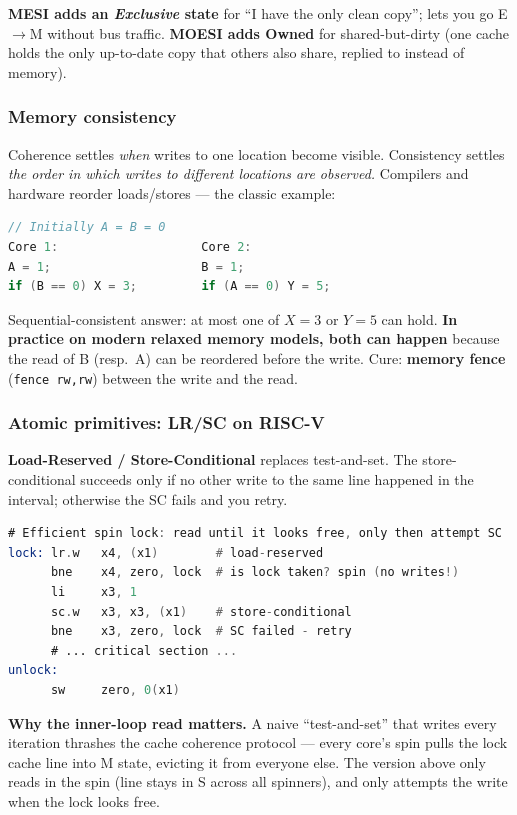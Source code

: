 \documentclass[11pt,a4paper]{article}
\begin{document}
\textbf{MESI adds an \emph{Exclusive} state} for ``I have the only clean copy''; lets you go E$\rightarrow$M without bus traffic. \textbf{MOESI adds Owned} for shared-but-dirty (one cache holds the only up-to-date copy that others also share, replied to instead of memory).

\subsubsection*{Memory consistency}

Coherence settles \emph{when} writes to one location become visible. Consistency settles \emph{the order in which writes to different locations are observed.} Compilers and hardware reorder loads/stores --- the classic example:

\begin{lstlisting}[language=c]
// Initially A = B = 0
Core 1:                    Core 2:
A = 1;                     B = 1;
if (B == 0) X = 3;         if (A == 0) Y = 5;
\end{lstlisting}

Sequential-consistent answer: at most one of $X=3$ or $Y=5$ can hold. \textbf{In practice on modern relaxed memory models, both can happen} because the read of B (resp.\ A) can be reordered before the write. Cure: \textbf{memory fence} (\verb|fence rw,rw|) between the write and the read.

\subsubsection*{Atomic primitives: LR/SC on RISC-V}

\textbf{Load-Reserved / Store-Conditional} replaces test-and-set. The store-conditional succeeds only if no other write to the same line happened in the interval; otherwise the SC fails and you retry.

\begin{lstlisting}[language=asm]
# Efficient spin lock: read until it looks free, only then attempt SC
lock: lr.w   x4, (x1)        # load-reserved
      bne    x4, zero, lock  # is lock taken? spin (no writes!)
      li     x3, 1
      sc.w   x3, x3, (x1)    # store-conditional
      bne    x3, zero, lock  # SC failed - retry
      # ... critical section ...
unlock:
      sw     zero, 0(x1)
\end{lstlisting}

\textbf{Why the inner-loop read matters.} A naive ``test-and-set'' that writes every iteration thrashes the cache coherence protocol --- every core's spin pulls the lock cache line into M state, evicting it from everyone else. The version above only reads in the spin (line stays in S across all spinners), and only attempts the write when the lock looks free.
\end{document}

